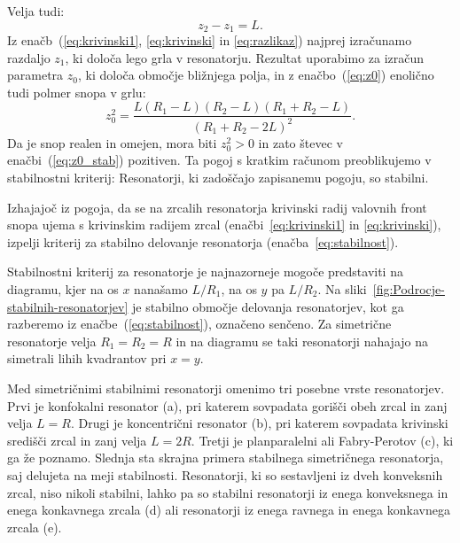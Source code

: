 Velja tudi:
\begin{equation}
z_{2}-z_{1}=L.
\label{eq:razlikaz}
\end{equation}
Iz  enačb~(\ref{eq:krivinski1}, \ref{eq:krivinski} in \ref{eq:razlikaz}) 
najprej izračunamo razdaljo $z_{1}$, ki določa
lego grla v resonatorju. Rezultat uporabimo za izračun parametra $z_{0}$, ki določa
območje bližnjega polja, in z enačbo~(\ref{eq:z0}) enolično tudi polmer snopa v grlu:
\begin{equation}
z_{0}^{2}=\frac{L(R_{1}-L)(R_{2}-L)(R_{1}+R_{2}-L)}{(R_{1}+R_{2}-2L)^{2}}.
\label{eq:z0_stab}
\end{equation}
Da je snop realen in omejen, mora biti $z_{0}^{2}>0$ in zato števec
v enačbi~(\ref{eq:z0_stab}) pozitiven. Ta pogoj s kratkim računom preoblikujemo
v stabilnostni kriterij:
Resonatorji, ki zadoščajo zapisanemu pogoju, so stabilni. 

\begin{naloga}
Izhajajoč iz pogoja, da se na zrcalih resonatorja krivinski radij valovnih front snopa ujema s krivinskim
radijem zrcal (enačbi~\ref{eq:krivinski1} in \ref{eq:krivinski}), izpelji 
kriterij za stabilno delovanje resonatorja 
(enačba~\ref{eq:stabilnost}).
\end{naloga}

Stabilnostni kriterij za resonatorje je najnazorneje mogoče predstaviti na diagramu, 
kjer na os $x$ nanašamo $L/R_{1}$, na os $y$ pa $L/R_{2}$. Na 
sliki~\ref{fig:Podrocje-stabilnih-resonatorjev} je stabilno območje delovanja 
resonatorjev, kot ga razberemo iz enačbe~(\ref{eq:stabilnost}), označeno senčeno.
Za simetrične resonatorje 
velja $R_{1}=R_{2}=R$ in na diagramu se taki resonatorji nahajajo na simetrali 
lihih kvadrantov pri $x=y$. 

Med simetričnimi stabilnimi resonatorji omenimo tri posebne vrste resonatorjev.
Prvi je konfokalni resonator (a), 
pri katerem sovpadata gorišči obeh zrcal in zanj velja $L=R$. Drugi je 
koncentrični resonator (b), 
pri katerem sovpadata krivinski središči zrcal in zanj velja $L=2R$.
Tretji je planparalelni ali Fabry-Perotov (c), ki ga že poznamo. 
Slednja sta skrajna primera stabilnega simetričnega resonatorja, saj delujeta na meji
stabilnosti. 
Resonatorji, ki so sestavljeni iz dveh konveksnih zrcal, niso nikoli stabilni, lahko
pa so stabilni resonatorji iz enega konveksnega in enega konkavnega zrcala (d)
ali resonatorji iz enega ravnega in enega konkavnega zrcala (e). 

